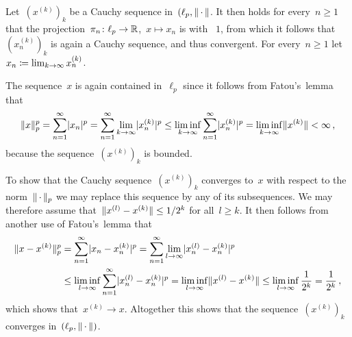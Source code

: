 \section{}





\subsection{}

Let~$(x^{(k)})_k$ be a Cauchy sequence in~$(\ell_p, \lVert\,\cdot\,\rVert$.
It then holds for every~$n \geq 1$ that the projection~$\pi_n \colon \ell_p \to \mathbb{R}$,~$x \mapsto x_n$ is {\lipcont} with {\lipconst}~$1$, from which it follows that~$(x^{(k)}_n)_k$ is again a Cauchy sequence, and thus convergent.
For every~$n \geq 1$ let~$x_n \coloneqq \lim_{k \to \infty} x^{(k)}_n$.

The sequence~$x$ is again contained in~$\ell_p$ since it follows from Fatou’s~lemma that
\[
        \lVert x\rVert_p^p
  =     \sum_{n=1}^\infty \lvert x_n\rvert^p
  =     \sum_{n=1}^\infty \lim_{k \to \infty} \lvert x_n^{(k)}\rvert^p
  \leq  \liminf_{k \to \infty} \sum_{n=1}^\infty \lvert x_n^{(k)}\rvert^p
  =     \liminf_{k \to \infty} \lVert x^{(k)}\rVert
  <     \infty \,,
\]
because the sequence~$(x^{(k)})_k$ is bounded.

To show that the Cauchy sequence~$(x^{(k)})_k$ converges to~$x$ with respect to the norm~$\lVert\,\cdot\,\rVert_p$ we may replace this sequence by any of its subsequences.
We may therefore assume that~$\lVert x^{(l)} - x^{(k)}\rVert \leq 1/2^k$ for all~$l \geq k$.
It then follows from another use of Fatou’s~lemma that
\begin{align*}
        \lVert x - x^{(k)}\rVert_p^p
  &=    \sum_{n=1}^\infty \lvert x_n - x^{(k)}_n \rvert^p
   =    \sum_{n=1}^\infty \lim_{l \to \infty} \lvert x^{(l)}_n - x^{(k)}_n \rvert^p \\
  &\leq \liminf_{l \to \infty} \sum_{n=1}^\infty \lvert x^{(l)}_n - x^{(k)}_n \rvert^p
   =    \liminf_{l \to \infty} \lVert x^{(l)} - x^{(k)}\rVert
   \leq \liminf_{l \to \infty} \frac{1}{2^k}
   =    \frac{1}{2^k} \,,
\end{align*}
which shows that~$x^{(k)} \to x$.
Altogether this shows that the sequence~$(x^{(k)})_k$ converges in~$(\ell_p, \lVert\,\cdot\,\rVert)$.






\subsection{}



